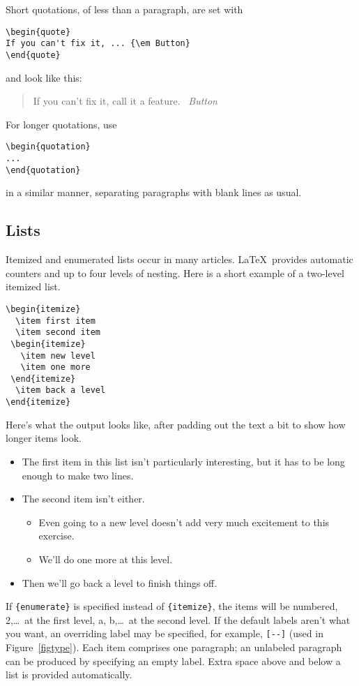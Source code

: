 Short quotations, of less than a paragraph, are set with
\begin{verbatim}
\begin{quote}
If you can't fix it, ... {\em Button}
\end{quote}
\end{verbatim}
and look like this:
\begin{quote}
If you can't fix it, call it a feature. \ {\em Button}
\end{quote}

\noindent
For longer quotations, use
\begin{verbatim}
\begin{quotation}
...
\end{quotation}
\end{verbatim}
in a similar manner, separating paragraphs with blank lines as usual.


\subsection{Lists}

Itemized and enumerated lists occur in many \DProc\/ articles.
\LaTeX\ provides automatic counters and up to four levels of nesting.
Here is a short example of a two-level itemized list.
\begin{verbatim}
\begin{itemize}
  \item first item
  \item second item
 \begin{itemize}
   \item new level
   \item one more
 \end{itemize}
  \item back a level
\end{itemize}
\end{verbatim}
\par\noindent
Here's what the output looks like, after padding out the text a bit to show
how longer items look.
\begin{itemize}
\item The first item in this list isn't particularly interesting,
        but it has to be long enough to make two lines.
\item The second item isn't either.
\begin{itemize}
\item Even going to a new level doesn't add very much
        excitement to this exercise.
\item We'll do one more at this level.
\end{itemize}
\item Then we'll go back a level to finish things off.
\end{itemize}
If \verb"{enumerate}" is specified instead of \verb"{itemize}", the
items will be numbered, 2,\dots\ at the first level,
a, b,\dots\ at the second level.  If the default labels aren't what
you want, an overriding label may be specified, for example,
\mbox{\verb"[--]"} (used in Figure~\ref{figtype}).  Each item
comprises one paragraph; an unlabeled paragraph can be produced by
specifying an empty label.  Extra space above and below a list is
provided automatically.

